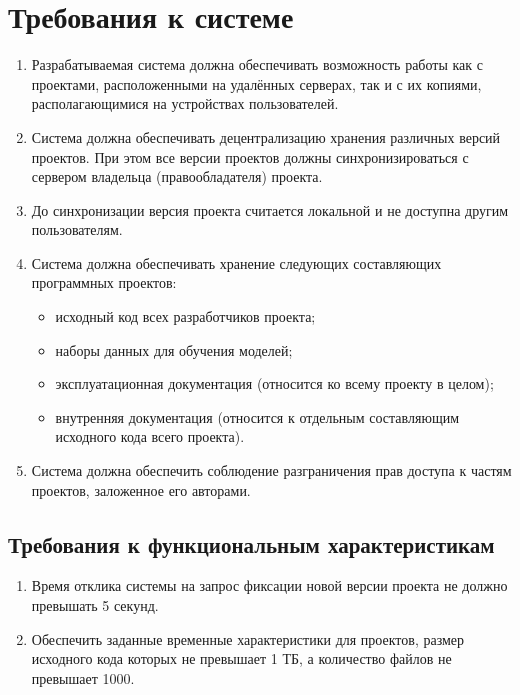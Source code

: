 \documentclass{bmstu}
\begin{document}
  \section{Требования к системе}
  \begin{enumerate}[label*=\arabic*.]
    \item Разрабатываемая система должна обеспечивать возможность
      работы как с проектами, расположенными на удалённых серверах,
      так и с их копиями, располагающимися на устройствах
      пользователей.
    \item Система должна обеспечивать децентрализацию хранения
      различных версий проектов. При этом все версии проектов должны
      синхронизироваться с сервером владельца (правообладателя)
      проекта.
    \item До синхронизации версия проекта считается локальной и не
      доступна другим пользователям.
    \item Система должна обеспечивать хранение следующих составляющих
      программных проектов:
    \begin{itemize}[label*=---]
      \item исходный код всех разработчиков проекта;
      \item наборы данных для обучения моделей;
      \item эксплуатационная документация (относится ко всему проекту
        в целом);
      \item внутренняя документация (относится к отдельным
        составляющим исходного кода всего проекта).
    \end{itemize}
    \item Система должна обеспечить соблюдение разграничения прав
      доступа к частям проектов, заложенное его авторами.
  \end{enumerate}

  \subsection{Требования к функциональным характеристикам}
  \begin{enumerate}[label*=\arabic*.]
    \item Время отклика системы на запрос фиксации новой версии
      проекта не должно превышать 5 секунд.
    \item Обеспечить заданные временные характеристики для проектов,
      размер исходного кода которых не превышает 1 ТБ, а количество
      файлов не превышает 1000.
  \end{enumerate}
\end{document}
